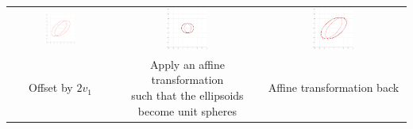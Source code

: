 \documentclass{article}
\begin{document}
\begin{table}[H]
	\centering
	\begin{tabular}{ccc}
		\includegraphics[width=0.3\textwidth]{union_offset_ia/3.pdf} & \includegraphics[width=0.3\textwidth]{union_offset_ia/4.pdf} & \includegraphics[width=0.3\textwidth]{union_offset_ia/5.pdf}\\
		Offset by $2v_1$ & \makecell{Apply an affine transformation \\such that the ellipsoids \\become unit spheres} & Affine transformation back \\

\end{tabular}
\end{table}
\end{document}
